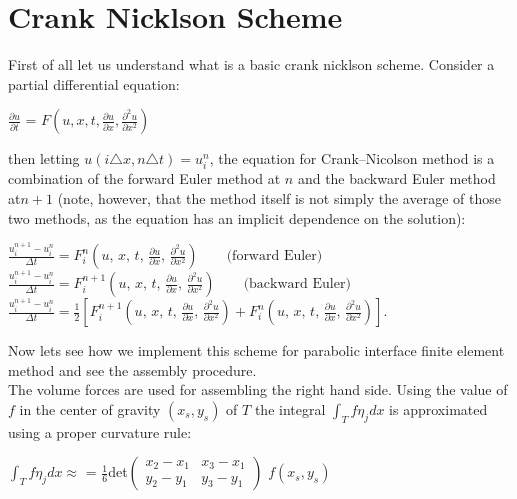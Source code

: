 \documentclass{report}
\numberwithin{equation}{chapter}
\begin{document}
\section{Crank Nicklson Scheme}
\begin{spacing}{1.5}
First of all let us understand what is a basic crank nicklson scheme. Consider a partial differential equation:
\begin{center}
$\frac{\partial u}{\partial t}$ = $F(u,x,t,\frac{\partial u}{\partial x}, \frac{\partial^{2} u}{\partial x^{2}})$
\end{center}
then letting $u(i\triangle x, n\triangle t) = u_{i}^{n}$, the equation for 
Crank–Nicolson method is a combination of the forward Euler method at $n$ and the backward Euler method at$ n + 1$ (note, however, that the method itself is not simply the average of those two methods, as the equation has an implicit dependence on the solution):\\
\begin{center}
$\frac{u_{i}^{n + 1} - u_{i}^{n}}{\Delta t} = F_{i}^{n}\left(u,\, x,\, t,\, \frac{\partial u}{\partial x},\, \frac{\partial^2 u}{\partial x^2}\right) \qquad \mbox{(forward Euler)}
$\\
$\frac{u_{i}^{n + 1} - u_{i}^{n}}{\Delta t} = F_{i}^{n + 1}\left(u,\, x,\, t,\, \frac{\partial u}{\partial x},\, \frac{\partial^2 u}{\partial x^2}\right) \qquad \mbox{(backward Euler)}
$\\
$ \frac{u_{i}^{n + 1} - u_{i}^{n}}{\Delta t} = \frac{1}{2}\left[ F_{i}^{n + 1}\left(u,\, x,\, t,\, \frac{\partial u}{\partial x},\, \frac{\partial^2 u}{\partial x^2}\right) + F_{i}^{n}\left(u,\, x,\, t,\, \frac{\partial u}{\partial x},\, \frac{\partial^2 u}{\partial x^2}\right) \right].
$ 
\end{center}
\bigskip
Now lets see how we implement this scheme for parabolic interface finite element method and see the assembly procedure.\\
The volume forces are used for assembling the right hand side. Using the value of $f$ in the center of gravity $(x_{s},y_{s})$ of $T$ the integral $\int_{T}f\eta_{j}dx$ is approximated using a proper curvature rule:
\begin{center}
$\int_{T}f\eta_{j}dx \approx$ = $\frac{1}{6}$det$
\begin{pmatrix}
x_{2}-x_{1} & x_{3}-x_{1}\\
y_{2}-y_{1} & y_{3}-y_{1}
\end{pmatrix}
$
$f(x_{s},y_{s})$
\end{center}
\bigskip\bigskip\bigskip\bigskip\bigskip\bigskip\bigskip

\end{spacing}
\end{document}
